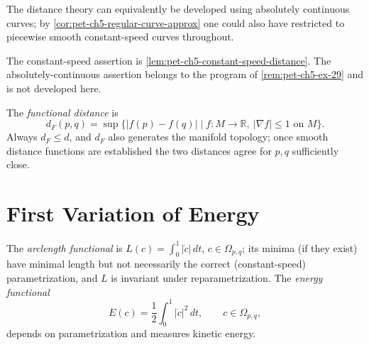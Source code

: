 \begin{remark}
  \label{rem:pet-ch5-absolutely-continuous-curves}
  The distance theory can equivalently be developed using absolutely continuous
  curves; by \cref{cor:pet-ch5-regular-curve-approx} one could also have restricted
  to piecewise smooth constant-speed curves throughout.

  The constant-speed assertion is
  \cref{lem:pet-ch5-constant-speed-distance}. The absolutely-continuous assertion
  belongs to the program of \cref{rem:pet-ch5-ex-29} and is not developed here.
\end{remark}

\begin{definition}
  \label{def:pet-ch5-functional-distance}


  The \emph{functional distance} is
  \[
    d_F(p,q)=\sup\{|f(p)-f(q)|\mid f:M\to\mathbb R,\ |\nabla f|\le1\text{ on }M\}.
  \]
  Always $d_F\le d$, and $d_F$ also generates the manifold topology; once smooth
  distance functions are established the two distances agree for $p,q$ sufficiently
  close.
\end{definition}

\section{First Variation of Energy}

\begin{definition}
  \label{def:pet-ch5-energy-functional}


  The \emph{arclength functional} is $L(c)=\int_0^1|\dot c|\,dt$, $c\in\Omega_{p,q}$;
  its minima (if they exist) have minimal length but not necessarily the correct
  (constant-speed) parametrization, and $L$ is invariant under reparametrization. The
  \emph{energy functional}
  \[
    E(c)=\frac12\int_0^1|\dot c|^2\,dt,\qquad c\in\Omega_{p,q},
  \]
  depends on parametrization and measures kinetic energy.
\end{definition}

